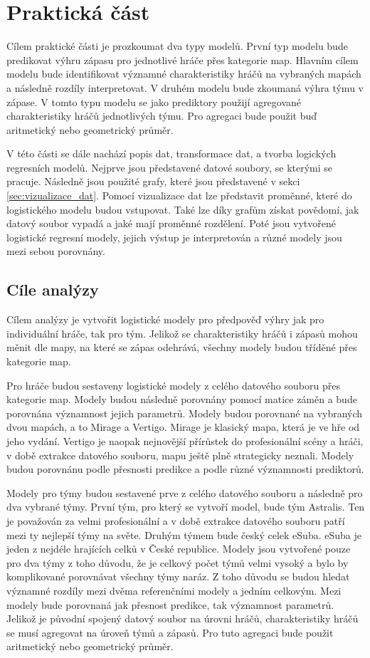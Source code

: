 \chapter{Praktická část}
{\color{red}
Cílem praktické části je prozkoumat dva typy modelů. První typ modelu bude predikovat výhru zápasu pro jednotlivé hráče přes kategorie map. Hlavním cílem 
modelu bude identifikovat významné charakteristiky hráčů na vybraných mapách a následně rozdíly interpretovat. V druhém modelu bude zkoumaná výhra týmu v zápase.
V tomto typu modelu se jako prediktory použijí agregované charakteristiky hráčů jednotlivých týmu. Pro agregaci bude použit buď aritmetický nebo geometrický průměr. 

V této části se dále nachází popis dat, transformace dat, a tvorba logických regresních modelů. Nejprve jsou představené datové soubory,
se kterými se pracuje. Následně jsou použité grafy, které jsou představené v sekci \ref{sec:vizualizace_dat}. Pomocí vizualizace dat lze představit proměnné, které
do logistického modelu budou vstupovat. Také lze díky grafům získat povědomí, jak datový soubor vypadá a jaké mají proměnné rozdělení.
Poté jsou vytvořené logistické regresní modely, jejich výstup je interpretován a různé modely jsou mezi sebou porovnány.
}

{\color{red}
\section{Cíle analýzy}
Cílem analýzy je vytvořit logistické modely pro předpověď výhry jak pro individuální hráče, tak pro tým. Jelikož se charakteristiky hráčů i zápasů mohou měnit dle mapy,
na které se zápas odehrává, všechny modely budou tříděné přes kategorie map.

Pro hráče budou sestaveny logistické modely z celého datového souboru přes kategorie map. Modely budou následně porovnány pomocí matice záměn
a bude porovnána významnost jejich parametrů. Modely budou porovnané na vybraných dvou mapách, a to Mirage a Vertigo. Mirage je klasický mapa, která je
ve hře od jeho vydání. Vertigo je naopak nejnovější přírůstek do profesionální scény a hráči, v době extrakce datového souboru, mapu ještě plně strategicky 
neznali. Modely budou porovnánu podle přesnosti predikce a podle různé významnosti prediktorů.

Modely pro týmy budou sestavené prve z celého datového souboru a následně pro dva vybrané týmy. První tým, pro který se vytvoří model, bude tým Astralis. Ten je považován
za velmi profesionální a v době extrakce datového souboru patří mezi ty nejlepší týmy na světe. Druhým týmem bude český celek eSuba. eSuba je jeden z nejdéle hrajících celků
v České republice. Modely jsou vytvořené pouze pro dva týmy z toho důvodu, že je celkový počet týmů velmi vysoký a bylo by komplikované 
porovnávat všechny týmy naráz. Z toho důvodu se budou hledat významné rozdíly mezi dvěma referenčními modely a jedním celkovým. Mezi modely bude porovnaná jak přesnost
predikce, tak významnost parametrů. Jelikož je původní spojený datový soubor na úrovni hráčů, charakteristiky hráčů se musí agregovat na úroveň týmů a zápasů. Pro tuto
agregaci bude použit aritmetický nebo geometrický průměr.
}

